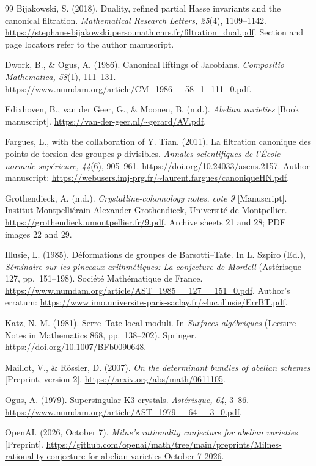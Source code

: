 \documentclass[11pt]{article}
\theoremstyle{definition}\newtheorem{definition}[theorem]{Definition}
\theoremstyle{remark}\newtheorem{remark}[theorem]{Remark}
\begin{document}
\begin{thebibliography}{99}
Bijakowski, S. (2018). Duality, refined partial Hasse invariants and the canonical filtration. \emph{Mathematical Research Letters, 25}(4), 1109--1142. \url{https://stephane-bijakowski.perso.math.cnrs.fr/filtration_dual.pdf}. Section and page locators refer to the author manuscript.

Dwork, B., \& Ogus, A. (1986). Canonical liftings of Jacobians. \emph{Compositio Mathematica, 58}(1), 111--131. \url{https://www.numdam.org/article/CM_1986__58_1_111_0.pdf}.

Edixhoven, B., van der Geer, G., \& Moonen, B. (n.d.). \emph{Abelian varieties} [Book manuscript]. \url{https://van-der-geer.nl/~gerard/AV.pdf}.

Fargues, L., with the collaboration of Y. Tian. (2011). La filtration canonique des points de torsion des groupes $p$-divisibles. \emph{Annales scientifiques de l'\'Ecole normale sup\'erieure, 44}(6), 905--961. \url{https://doi.org/10.24033/asens.2157}. Author manuscript: \url{https://webusers.imj-prg.fr/~laurent.fargues/canoniqueHN.pdf}.

Grothendieck, A. (n.d.). \emph{Crystalline-cohomology notes, cote 9} [Manuscript]. Institut Montpelli\'erain Alexander Grothendieck, Universit\'e de Montpellier. \url{https://grothendieck.umontpellier.fr/9.pdf}. Archive sheets 21 and 28; PDF images 22 and 29.

Illusie, L. (1985). D\'eformations de groupes de Barsotti--Tate. In L. Szpiro (Ed.), \emph{S\'eminaire sur les pinceaux arithm\'etiques: La conjecture de Mordell} (Ast\'erisque 127, pp.~151--198). Soci\'et\'e Math\'ematique de France. \url{https://www.numdam.org/article/AST_1985__127__151_0.pdf}. Author's erratum: \url{https://www.imo.universite-paris-saclay.fr/~luc.illusie/ErrBT.pdf}.

Katz, N. M. (1981). Serre--Tate local moduli. In \emph{Surfaces alg\'ebriques} (Lecture Notes in Mathematics 868, pp.~138--202). Springer. \url{https://doi.org/10.1007/BFb0090648}.

Maillot, V., \& R\"ossler, D. (2007). \emph{On the determinant bundles of abelian schemes} [Preprint, version 2]. \url{https://arxiv.org/abs/math/0611105}.

Ogus, A. (1979). Supersingular K3 crystals. \emph{Ast\'erisque, 64}, 3--86. \url{https://www.numdam.org/article/AST_1979__64__3_0.pdf}.

OpenAI. (2026, October 7). \emph{Milne's rationality conjecture for abelian varieties} [Preprint]. \url{https://github.com/openai/math/tree/main/preprints/Milnes-rationality-conjecture-for-abelian-varieties-October-7-2026}.
\end{thebibliography}
\end{document}
